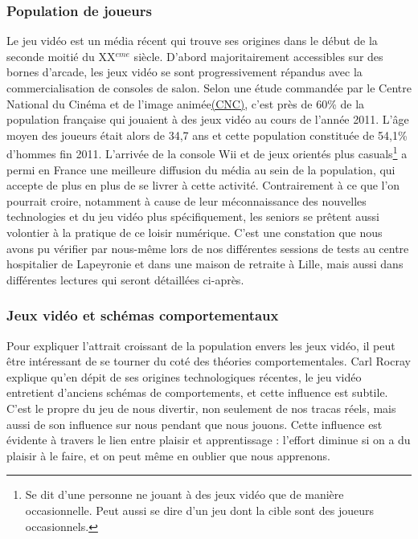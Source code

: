 	\subsubsection*{Population de joueurs}
Le jeu vidéo est un média récent qui trouve ses origines dans le début de la seconde moitié du XX$^{eme}$ siècle. D'abord majoritairement accessibles sur des bornes d'arcade, les jeux vidéo se sont progressivement répandus avec la commercialisation de consoles de salon. Selon une étude commandée par le Centre National du Cinéma et de l'image animée\href{http://www.cnc.fr}{(CNC)}, c'est près de 60\% de la population française qui jouaient à des jeux vidéo au cours de l'année 2011\cite{Cnc11}. L'âge moyen des joueurs était alors de 34,7 ans et cette population constituée de 54,1\% d'hommes fin 2011\cite{Cnc11}. L'arrivée de la console Wii et de jeux orientés plus casuals\footnote{Se dit d'une personne ne jouant à des jeux vidéo que de manière occasionnelle. Peut aussi se dire d'un jeu dont la cible sont des joueurs occasionnels.} a permi en France une meilleure diffusion du média au sein de la population, qui accepte de plus en plus de se livrer à cette activité. Contrairement à ce que l'on pourrait croire, notamment à cause de leur méconnaissance des nouvelles technologies et du jeu vidéo plus spécifiquement, les seniors se prêtent aussi volontier à la pratique de ce loisir numérique. C'est une constation que nous avons pu vérifier par nous-même lors de nos différentes sessions de tests au centre hospitalier de Lapeyronie et dans une maison de retraite à Lille, mais aussi dans différentes lectures qui seront détaillées ci-après.
	
	\subsubsection{Jeux vidéo et schémas comportementaux}
Pour expliquer l'attrait croissant de la population envers les jeux vidéo, il peut être intéressant de se tourner du coté des théories comportementales. Carl Rocray \cite{Rocr09} explique qu'en dépit de ses origines technologiques récentes, le jeu vidéo entretient d’anciens schémas de comportements, et cette influence est subtile. C’est le propre du jeu de nous divertir, non seulement de nos tracas réels, mais aussi de son influence sur nous pendant que nous jouons. Cette influence est évidente à travers le lien entre plaisir et apprentissage : l’effort diminue si on a du plaisir à le faire, et on peut même en oublier que nous apprenons.

